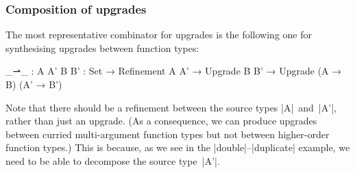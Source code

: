 \subsubsection{Composition of upgrades}
The most representative combinator for upgrades is the following one for synthesising upgrades between function types:
\begin{code}
_⇀_ :  {A A' B B' : Set} →
       Refinement A A' → Upgrade B B' → Upgrade (A → B) (A' → B')
\end{code}
Note that there should be a refinement between the source types |A|~and~|A'|, rather than just an upgrade.
(As a consequence, we can produce upgrades between curried multi-argument function types but not between higher-order function types.)
This is because, as we see in the |double|--|duplicate| example, we need to be able to decompose the source type~|A'|.

